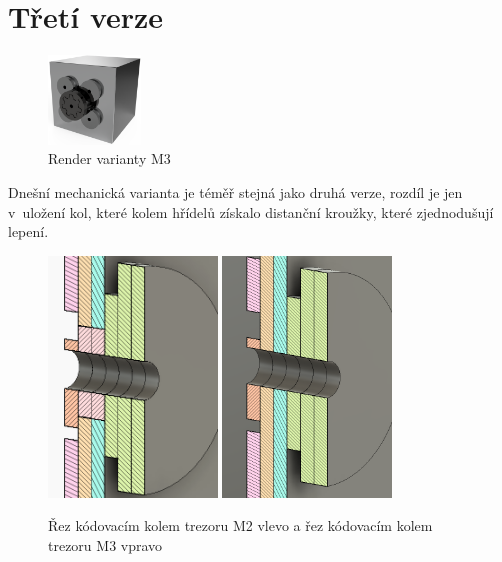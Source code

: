 \section{Třetí verze}

\begin{figure}[htbp]
    \centering
    \includegraphics[width=70pt]{kapitoly/obrazky/M3/predni_render.png}
    \caption{Render varianty M3}
    \label{fig:M3-render}
\end{figure}

Dnešní mechanická varianta je téměř stejná jako druhá verze, rozdíl je jen v~uložení kol, které kolem hřídelů získalo distanční kroužky, které
zjednodušují lepení. 

\begin{figure}[h]
    \centering
    \includegraphics[width=0.4\textwidth]{kapitoly/obrazky/M3/rez.png}
    \includegraphics[width=0.4\textwidth]{kapitoly/obrazky/M2/rez.png}
    \caption{Řez kódovacím kolem trezoru M2 vlevo a řez kódovacím kolem trezoru M3 vpravo \centering}
    \label{fig:M3-rez-kolem}
\end{figure}

\newpage